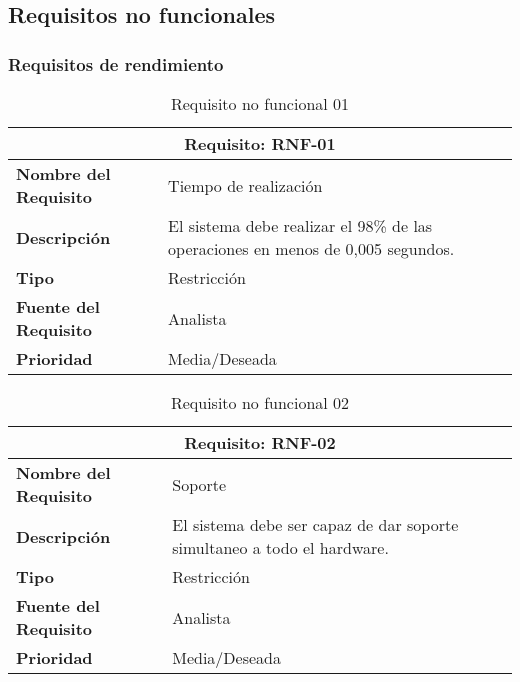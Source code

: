 \subsection{Requisitos no funcionales}

\subsubsection{Requisitos de rendimiento}

\begin{table}[H]
\begin{center}
\begin{tabular}{p{} p{7cm}}
\multicolumn{2}{c}{\textbf{Requisito: RNF-01} } \\
\hline \hline
\textbf{Nombre del Requisito} & Tiempo de realización\\
\hline
\textbf{Descripción} &  El sistema debe realizar el 98\% de las operaciones en menos de 0,005 segundos.\\
\hline
\textbf{Tipo} & Restricción  \\
\hline
\textbf{Fuente del Requisito} & Analista  \\
\hline
\textbf{Prioridad} & Media/Deseada \\ \hline
\end{tabular}
\caption{Requisito no funcional 01}
\label{tab:RNF-01}
\end{center}
\end{table}

\begin{table}[H]
\begin{center}
\begin{tabular}{p{} p{7cm}}
\multicolumn{2}{c}{\textbf{Requisito: RNF-02} } \\
\hline \hline
\textbf{Nombre del Requisito} & Soporte\\
\hline
\textbf{Descripción} & El sistema debe ser capaz de dar soporte simultaneo a todo el hardware.\\
\hline
\textbf{Tipo} & Restricción  \\
\hline
\textbf{Fuente del Requisito} & Analista  \\
\hline
\textbf{Prioridad} & Media/Deseada \\ \hline
\end{tabular}
\caption{Requisito no funcional 02}
\label{tab:RNF-02}
\end{center}
\end{table}


